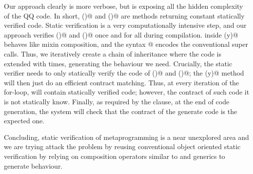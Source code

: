 \documentclass[a4paper,twoside,british,9pt]{extarticle}
\begin{document}
\vspace{-2ex}
Our approach clearly is more verbose, but is exposing all the hidden complexity
of the QQ code.
In short, \Q@base()@ and \Q@inductive()@ 
are methods returning constant statically verified code. Static verification is a very computationally intensive step, and our approach verifies
\Q@base()@ and \Q@inductive()@ once and for all during compilation.
\Q@Override@ inside \Q@generate(y)@ behaves like mixin composition,
and the syntax @ encodes the
conventional super calls.
Thus, we iteratively create a chain of inheritance where
the \Q@base@ code is extended with \Q@inductive@ \Q@y@
times, generating the behaviour we need.
Crucially, the static verifier needs to only statically verify the
code of \Q@base()@ and \Q@inductive()@;
the \Q@generate(y)@ method will then just do
an efficient contract matching.
Thus, at every iteration of the for-loop, \Q@res@
will contain statically verified code; however, the contract of such code it is not statically know.
Finally, as required by the \Q@ensuresRV@ clause, at the end of code generation, the system will
check that the contract of the generate code is the expected one.

Concluding, static verification of metaprogramming is a
near unexplored area and we are trying attack the problem by reusing conventional
object oriented static verification by
relying on
composition operators similar to \Q@extends@ and generics to
generate behaviour.
\vspace{-3ex}

{\tiny }
\end{document}

